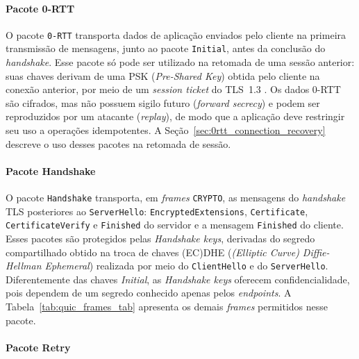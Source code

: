 \paragraph{Pacote 0-RTT}

O pacote \texttt{0-RTT} transporta dados de aplicação enviados pelo cliente na primeira transmissão de mensagens, junto ao pacote \texttt{Initial}, antes da conclusão do \textit{handshake}. Esse pacote só pode ser utilizado na retomada de uma sessão anterior: suas chaves derivam de uma PSK (\textit{Pre-Shared Key}) obtida pelo cliente na conexão anterior, por meio de um \textit{session ticket} do TLS~1.3 \citep{rfc8446}. Os dados 0-RTT são cifrados, mas não possuem sigilo futuro (\textit{forward secrecy}) e podem ser reproduzidos por um atacante (\textit{replay}), de modo que a aplicação deve restringir seu uso a operações idempotentes. A Seção~\ref{sec:0rtt_connection_recovery} descreve o uso desses pacotes na retomada de sessão.

\paragraph{Pacote Handshake}

O pacote \texttt{Handshake} transporta, em \textit{frames} \texttt{CRYPTO}, as mensagens do \textit{handshake} TLS posteriores ao \texttt{ServerHello}: \texttt{EncryptedExtensions}, \texttt{Certificate}, \texttt{CertificateVerify} e \texttt{Finished} do servidor e a mensagem \texttt{Finished} do cliente. Esses pacotes são protegidos pelas \textit{Handshake keys}, derivadas do segredo compartilhado obtido na troca de chaves (EC)DHE (\textit{(Elliptic Curve) Diffie-Hellman Ephemeral}) realizada por meio do \texttt{ClientHello} e do \texttt{ServerHello}. Diferentemente das chaves \textit{Initial}, as \textit{Handshake keys} oferecem confidencialidade, pois dependem de um segredo conhecido apenas pelos \textit{endpoints}. A Tabela~\ref{tab:quic_frames_tab} apresenta os demais \textit{frames} permitidos nesse pacote.

\paragraph{Pacote Retry}

